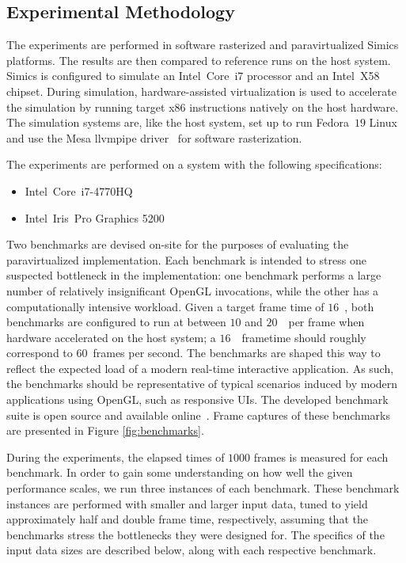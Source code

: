 \subsection{Experimental Methodology}
\label{sec:experimentalmethodology}
The experiments are performed in software rasterized and paravirtualized Simics platforms.
The results are then compared to reference runs on the host system.
Simics is configured to simulate an Intel\circledR ~Core\texttrademark ~i7 processor and an Intel\circledR ~X58 chipset.
During simulation, hardware-assisted virtualization is used to accelerate the simulation by running target x86 instructions natively on the host hardware.
The simulation systems are, like the host system, set up to run Fedora~$19$ Linux and use the Mesa llvmpipe driver~ for software rasterization.

The experiments are performed on a system with the following specifications:
\begin{itemize}
\item Intel\circledR\ Core\texttrademark\ i7-4770HQ
\item Intel\circledR\ Iris\texttrademark\ Pro Graphics 5200
\end{itemize}

Two benchmarks are devised on-site for the purposes of evaluating the paravirtualized implementation.
Each benchmark is intended to stress one suspected bottleneck in the implementation: one benchmark performs a large number of relatively insignificant OpenGL invocations, while the other has a computationally intensive workload.
Given a target frame time of $16$~\milli\second , both benchmarks are configured to run at between $10$ and $20$~\milli\second\ per frame when hardware accelerated on the host system; a $16$~\milli\second\ frametime should roughly correspond to $60$~frames per second.
The benchmarks are shaped this way to reflect the expected load of a modern real-time interactive application.
As such, the benchmarks should be representative of typical scenarios induced by modern applications using OpenGL, such as responsive UIs.
The developed benchmark suite is open source and available online~.
Frame captures of these benchmarks are presented in Figure \ref{fig:benchmarks}.

During the experiments, the elapsed times of $1000$ frames is measured for each benchmark.
In order to gain some understanding on how well the given performance scales, we run three instances of each benchmark.
These benchmark instances are performed with smaller and larger input data, tuned to yield approximately half and double frame time, respectively, assuming that the benchmarks stress the bottlenecks they were designed for.
The specifics of the input data sizes are described below, along with each respective benchmark.

